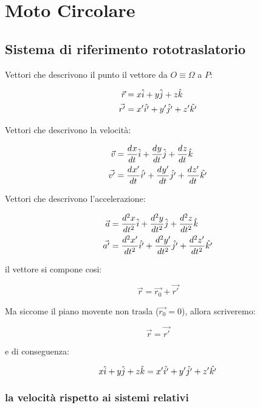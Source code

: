 \chapter{Moto Circolare}

\section{Sistema di riferimento rototraslatorio}

Vettori che descrivono il punto il vettore da $O \equiv \Omega$ a $P$:

\begin{align*}
  \vec{r}  & = x\uvec{i} + y\uvec{j} + z\uvec{k}       \\
  \vec{r'} & = x'\uvec{i'} + y'\uvec{j'} + z'\uvec{k'}
\end{align*}

Vettori che descrivono la velocità:

\begin{align*}
  \vec{v}  & = \der{x}{t}\uvec{i} + \der{y}{t}\uvec{j} + \der{z}{t}\uvec{k}       \\
  \vec{v'} & = \der{x'}{t}\uvec{i'} + \der{y'}{t}\uvec{j'} + \der{z'}{t}\uvec{k'}
\end{align*}

Vettori che descrivono l'accelerazione:

\begin{align*}
  \vec{a}  & = \der[2]{x}{t}\uvec{i} + \der[2]{y}{t}\uvec{j} + \der[2]{z}{t}\uvec{k}       \\
  \vec{a'} & = \der[2]{x'}{t}\uvec{i'} + \der[2]{y'}{t}\uvec{j'} + \der[2]{z'}{t}\uvec{k'}
\end{align*}

il vettore si compone cosi:

\begin{equation}
  \vec{r} = \vec{r_0} + \vec{r'}
\end{equation}

Ma siccome il piano movente non trasla ($\vec{r_0} = 0$), allora scriveremo:

$$ \vec{r} = \vec{r'} $$

e di conseguenza:

\begin{equation}
  x\uvec{i} + y\uvec{j} + z\uvec{k} = x'\uvec{i'} + y'\uvec{j'} + z'\uvec{k'}
\end{equation}


\subsection{la velocità rispetto ai sistemi relativi}

